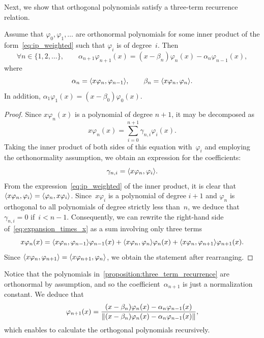 Next, we show that orthogonal polynomials satisfy a three-term recurrence relation.
\begin{proposition}
    \label{proposition:three_term_recurrence}
    Assume that $\varphi_0, \varphi_1, \dotsc$ are orthonormal polynomials
    for some inner product of the form~\eqref{eq:ip_weighted} such that $\varphi_i$ is of degree~$i$.
    Then
    \begin{equation}
        \label{eq:recurrence_ortho}
        \forall n \in \{1, 2, \dotsc\}, \qquad
        \alpha_{n+1} \varphi_{n+1} (x) = (x - \beta_n) \varphi_n(x) - \alpha_{n} \varphi_{n-1}(x),
    \end{equation}
    where
    \[
        \alpha_n = \ip[big]{x \varphi_n, \varphi_{n-1}},
        \qquad \beta_n = \ip[big]{x \varphi_n, \varphi_{n}}.
    \]
    In addition, $\alpha_1 \varphi_{1} (x) = (x - \beta_0) \varphi_0(x)$.
\end{proposition}
\begin{proof}
    Since $x \varphi_n(x)$ is a polynomial of degree $n+1$,
    it may be decomposed as
    \begin{equation}
        \label{eq:expansion_times_x}
        x \varphi_n(x) = \sum_{i=0}^{n+1} \gamma_{n,i} \varphi_i(x).
    \end{equation}
    Taking the inner product of both sides of this equation with~$\varphi_i$
    and employing the orthonormality assumption,
    we obtain an expression for the coefficients:
    \[
        \gamma_{n,i} = \ip[big]{x \varphi_n, \varphi_i}.
    \]
    From the expression~\eqref{eq:ip_weighted} of the inner product,
    it is clear that $\ip[big]{x \varphi_n, \varphi_i} = \ip[big]{\varphi_n, x\varphi_i}$.
    Since~$x \varphi_i$ is a polynomial of degree $i+1$ and $\varphi_n$ is orthogonal to all polynomials of degree strictly less than~$n$,
    we deduce that $\gamma_{n,i} = 0$ if~$i < n-1$.
    Consequently, we can rewrite the right-hand side of~\eqref{eq:expansion_times_x} as a sum involving only three terms
    \begin{equation}
        \label{eq:expansion_times_x_good}
        x \varphi_n(x) =  \ip[big]{x \varphi_n, \varphi_{n-1}} \varphi_{n-1}(x) + \ip[big]{x \varphi_n, \varphi_{n}} \varphi_{n}(x) + \ip[big]{x \varphi_n, \varphi_{n+1}} \varphi_{n+1}(x).
    \end{equation}
    Since $\ip[big]{x \varphi_n, \varphi_{n+1}} = \ip[big]{x \varphi_{n+1}, \varphi_{n}}$,
    we obtain the statement after rearranging.
\end{proof}
\begin{remark}
    Notice that the polynomials in~\eqref{proposition:three_term_recurrence} are orthonormal by assumption,
    and so the coefficient~$\alpha_{n+1}$ is just a normalization constant.
    We deduce that
    \[
        \varphi_{n+1} (x) = \frac{(x - \beta_n) \varphi_n(x) - \alpha_{n} \varphi_{n-1}(x)}{\lVert(x - \beta_n) \varphi_n(x) - \alpha_{n} \varphi_{n-1}(x)\rVert},
    \]
    which enables to calculate the orthogonal polynomials recursively.
\end{remark}

